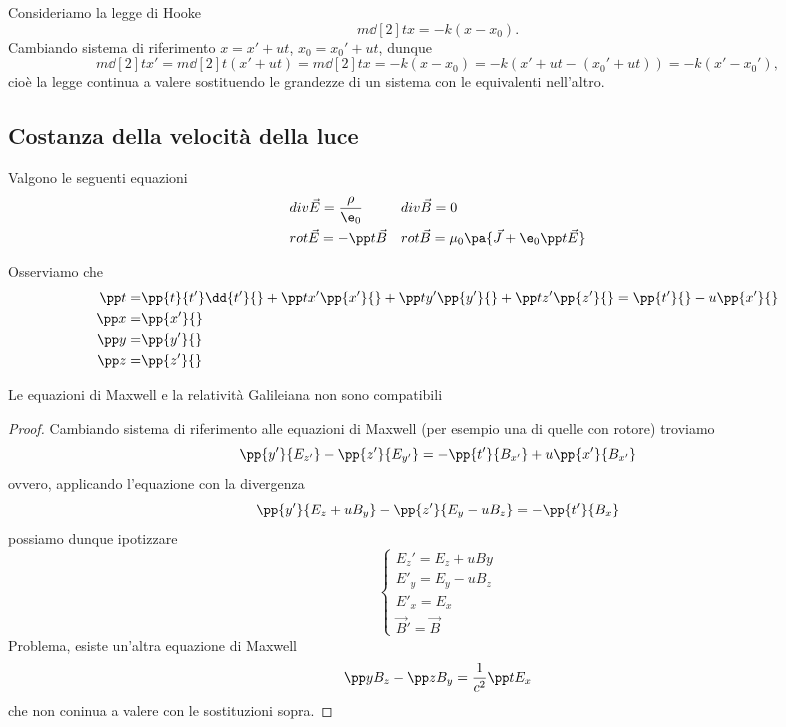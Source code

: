 \begin{example}
Consideriamo la legge di Hooke
\[m\dd[2] tx=-k(x-x_0).\]
Cambiando sistema di riferimento $x=x'+ut$, $x_0=x_0'+ut$, dunque
\[m\dd[2]t{x'}=m\dd[2] t{}(x'+ut)=m\dd[2] tx=-k(x-x_0)=-k(x'+ut-(x_0'+ut))=-k(x'-x_0'),\]
cio\`e la legge continua a valere sostituendo le grandezze di un sistema con le equivalenti nell'altro.
\end{example}

\subsection{Costanza della velocit\`a della luce}
\begin{fact}
Valgono le seguenti equazioni
\begin{align*}
&div\vec E=\frac{\rho}{\e_0}
&&div\vec B=0\\
&rot\vec E=-\pp t{\vec B}
&&rot\vec B=\mu_0\pa{\vec J+\e_0\pp t{\vec E}}
\end{align*}
\end{fact}
\noindent
Osserviamo che
\begin{align*}
\pp t{}=&\pp {t}{t'}\dd{t'}{}+\pp t{x'}\pp {x'}{}+\pp t{y'}\pp {y'}{}+\pp t{z'}\pp {z'}{}=\pp{t'}{}-u\pp{x'}{}\\
\pp x{}=&\pp {x'}{}\\
\pp y{}=&\pp {y'}{}\\
\pp z{}=&\pp {z'}{}
\end{align*}

\begin{example}
Le equazioni di Maxwell e la relativit\`a Galileiana non sono compatibili
\end{example}
\begin{proof}
Cambiando sistema di riferimento alle equazioni di Maxwell (per esempio una di quelle con rotore) troviamo
\[\pp {y'}{E_{z'}}-\pp {z'}{E_{y'}}=-\pp {t'}{B_{x'}}+u\pp {x'}{B_{x'}}\]
ovvero, applicando l'equazione con la divergenza
\[\pp {y'}{E_{z}+uB_y}-\pp {z'}{E_{y}-uB_z}=-\pp {t'}{B_{x}}\]
possiamo dunque ipotizzare
\[\begin{cases}
E_z'=E_z+uBy\\
E'_y=E_y-uB_z\\
E'_x=E_x\\
\vec B'=\vec B
\end{cases}\]
Problema, esiste un'altra equazione di Maxwell
\[\pp y{B_z}-\pp z{B_y}=\frac1{c^2}\pp t{E_x}\]
che non coninua a valere con le sostituzioni sopra.
\end{proof}

